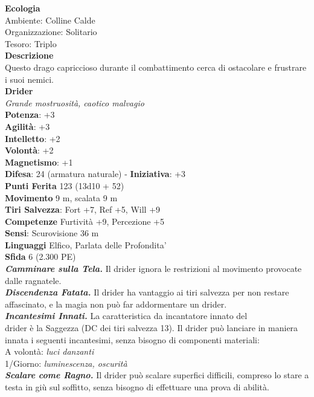 \begin{multicols}{2}
\textbf{Ecologia}\\
Ambiente: Colline Calde\\
Organizzazione: Solitario\\
Tesoro: Triplo\\
\textbf{Descrizione}\\
Questo drago capriccioso durante il combattimento cerca di ostacolare e frustrare i suoi nemici.\\


\medskip\textbf{Drider}\\
\emph{Grande mostruosità, caotico malvagio}\\
\textbf{Potenza}: +3\\
\textbf{Agilità}: +3\\
\textbf{Intelletto}: +2\\
\textbf{Volontà}: +2\\
\textbf{Magnetismo}: +1\\
\textbf{Difesa}: 24 (armatura naturale) - \textbf{Iniziativa}: +3\\
\textbf{Punti Ferita} 123 (13d10 + 52)\\
\textbf{Movimento} 9 m, scalata 9 m\\
\textbf{Tiri Salvezza}: Fort +7, Ref +5, Will +9\\
\textbf{Competenze} Furtività +9, Percezione +5\\
\textbf{Sensi}: Scurovisione 36 m\\
\textbf{Linguaggi} Elfico, Parlata delle Profondita'\\
\textbf{Sfida} 6 (2.300 PE)\smallskip\\
\emph{\textbf{Camminare sulla Tela.}} Il drider ignora le restrizioni al movimento provocate dalle ragnatele.\\
\emph{\textbf{Discendenza Fatata.}} Il drider ha vantaggio ai tiri salvezza per non restare affascinato, e la magia non può far addormentare un drider.\\
\emph{\textbf{Incantesimi Innati.}} La caratteristica da incantatore innato del\\
drider è la Saggezza (DC dei tiri salvezza 13). Il drider può lanciare in maniera innata i seguenti incantesimi, senza bisogno  di componenti materiali:\\
A volontà: \emph{luci danzanti}\\
1/Giorno: \emph{luminescenza, oscurità}\\
\emph{\textbf{Scalare come Ragno.}} Il drider può scalare superfici difficili, compreso lo stare a testa in giù sul soffitto, senza bisogno di effettuare una prova di abilità.\\

\end{multicols}
